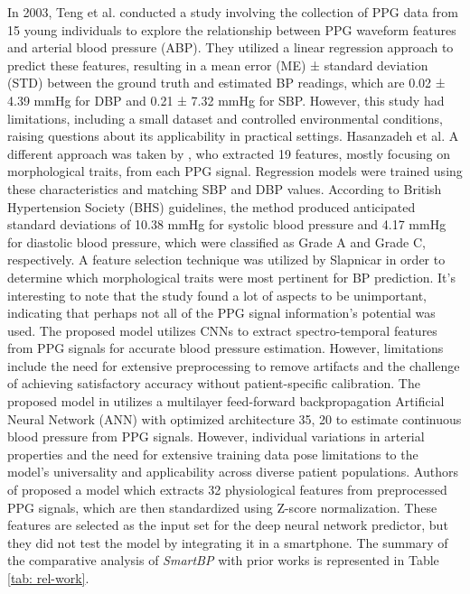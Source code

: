 \documentclass[journal,twoside,web]{ieeecolor}
\begin{document}
In 2003, Teng et al. \cite{b23} conducted a study involving the collection of PPG data from 15 young individuals to explore the relationship between PPG waveform features and arterial blood pressure (ABP). They utilized a linear regression approach to predict these features, resulting in a mean error (ME) ± standard deviation (STD) between the ground truth and estimated BP readings, which are 0.02 ± 4.39 mmHg for DBP and 0.21 ± 7.32 mmHg for SBP. However, this study had limitations, including a small dataset and controlled environmental conditions, raising questions about its applicability in practical settings. Hasanzadeh et al. A different approach was taken by \cite{b24}, who extracted 19 features, mostly focusing on morphological traits, from each PPG signal. Regression models were trained using these characteristics and matching SBP and DBP values. According to British Hypertension Society (BHS) guidelines, the method produced anticipated standard deviations of 10.38 mmHg for systolic blood pressure and 4.17 mmHg for diastolic blood pressure, which were classified as Grade A and Grade C, respectively. A feature selection technique was utilized by Slapnicar \cite{b26} in order to determine which morphological traits were most pertinent for BP prediction. It's interesting to note that the study found a lot of aspects to be unimportant, indicating that perhaps not all of the PPG signal information's potential was used. The proposed model \cite{b6} utilizes CNNs to extract spectro-temporal features from PPG signals for accurate blood pressure estimation. However, limitations include the need for extensive preprocessing to remove artifacts and the challenge of achieving satisfactory accuracy without patient-specific calibration. The proposed model in \cite{b7} utilizes a multilayer feed-forward backpropagation Artificial Neural Network (ANN) with optimized architecture {35, 20} to estimate continuous blood pressure from PPG signals. However, individual variations in arterial properties and the need for extensive training data pose limitations to the model's universality and applicability across diverse patient populations. Authors of \cite{b16} proposed a model which extracts 32 physiological features from preprocessed PPG signals, which are then standardized using Z-score normalization. These features are selected as the input set for the deep neural network predictor, but they did not test the model by integrating it in a smartphone. The summary of the comparative analysis of \textit{SmartBP} with prior works is represented in Table \ref{tab: rel-work}.
\end{document}
